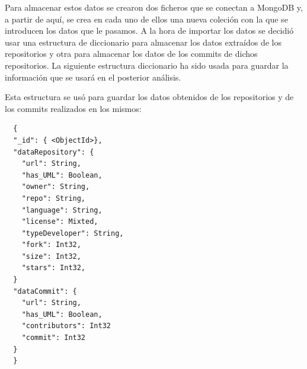 \documentclass[a4paper, 12pt]{book}
\begin{document}
Para almacenar estos datos se crearon dos ficheros que se conectan a MongoDB y, a partir de aquí, se crea en cada uno de ellos una nueva coleción con la que se introducen los datos que le pasamos.
A la hora de importar los datos se decidió usar una estructura de diccionario para almacenar los datos extraídos de los repositorios y otra para almacenar los datos de los commits de dichos repositorios.
La siguiente estructura diccionario ha sido usada para guardar la información que se usará en el posterior análisis. 


Esta estructura se usó para guardar los datos obtenidos de los repositorios y de los commits realizados en los mismos:
{\footnotesize
\begin{verbatim}
  {
  "_id": { <ObjectId>},
  "dataRepository": {
    "url": String,
    "has_UML": Boolean,
    "owner": String,
    "repo": String,
    "language": String,
    "license": Mixted,
    "typeDeveloper": String,
    "fork": Int32,
    "size": Int32,
    "stars": Int32,
  }
  "dataCommit": {
    "url": String,
    "has_UML": Boolean,
    "contributors": Int32
    "commit": Int32
  }
  }
\end{verbatim}
}
\end{document}
